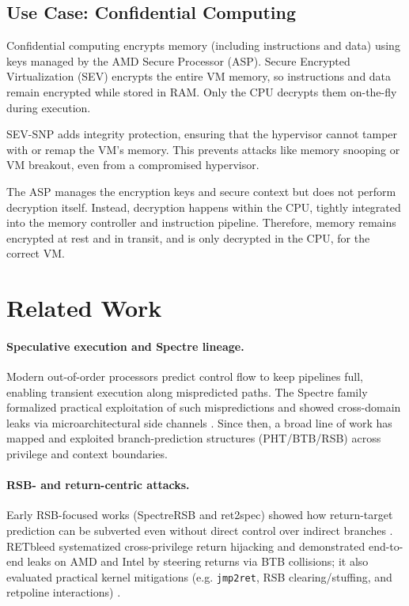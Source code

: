 \documentclass[11pt,a4paper]{article}
\begin{document}
\subsection{Use Case: Confidential Computing}
Confidential computing encrypts memory (including instructions and data) using keys managed by the AMD Secure Processor (ASP). Secure Encrypted Virtualization (SEV) encrypts the entire VM memory, so instructions and data remain encrypted while stored in RAM. Only the CPU decrypts them on-the-fly during execution.

SEV-SNP adds integrity protection, ensuring that the hypervisor cannot tamper with or remap the VM's memory. This prevents attacks like memory snooping or VM breakout, even from a compromised hypervisor.

The ASP manages the encryption keys and secure context but does not perform decryption itself. Instead, decryption happens within the CPU, tightly integrated into the memory controller and instruction pipeline. Therefore, memory remains encrypted at rest and in transit, and is only decrypted in the CPU, for the correct VM.
\clearpage

\section{Related Work}
\label{sec:related}

\paragraph{Speculative execution and Spectre lineage.} Modern out-of-order processors predict control flow to keep pipelines full, enabling transient execution along mispredicted paths. The Spectre family formalized practical exploitation of such mispredictions and showed cross-domain leaks via microarchitectural side channels \cite{kocher2018spectre}. Since then, a broad line of work has mapped and exploited branch-prediction structures (PHT/BTB/RSB) across privilege and context boundaries.

\paragraph{RSB- and return-centric attacks.}
Early RSB-focused works (SpectreRSB and ret2spec) showed how return-target prediction can be subverted even without direct control over indirect branches \cite{koruyeh2018spectrersb,maisuradze2018ret2spec}. RETbleed systematized cross-privilege return hijacking and demonstrated end-to-end leaks on AMD and Intel by steering returns via BTB collisions; it also evaluated practical kernel mitigations (e.g. \texttt{jmp2ret}, RSB clearing/stuffing, and retpoline interactions) \cite{wikner2022retbleed}.
\end{document}
